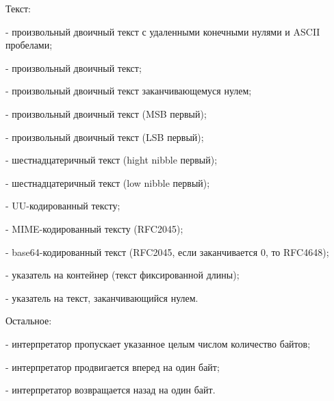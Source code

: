 \begin{keylist}{Текст:}
  
   - произвольный двоичный текст с удаленными конечными нулями и ASCII пробелами; 
  
   - произвольный двоичный текст; 
  
   - произвольный двоичный текст заканчивающемуся нулем;
  
   - произвольный двоичный текст (MSB первый); 
  
   - произвольный двоичный текст (LSB первый); 
  
   - шестнадцатеричный текст (hight nibble первый); 
  
   - шестнадцатеричный текст (low nibble первый); 
  
   - UU-кодированный тексту; 
  
   - MIME-кодированный тексту (RFC2045); 
  
   - base64-кодированный текст (RFC2045, если заканчивается 0, то RFC4648); 
  
   - указатель на контейнер (текст фиксированной длины); 
  
   - указатель на текст, заканчивающийся нулем. 
\end{keylist}

\begin{keylist}{Остальное:}
  
   - интерпретатор пропускает указанное целым числом количество байтов; 
  
   - интерпретатор продвигается вперед на один байт;
  
   - интерпретатор возвращается назад на один байт.
\end{keylist}
